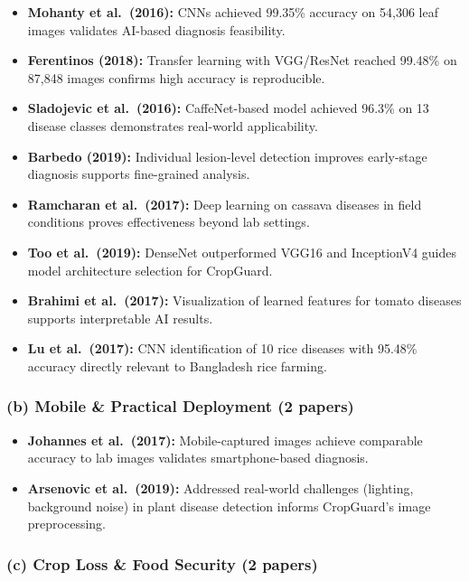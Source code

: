 \documentclass[12pt,a4paper]{article}
\begin{document}
\begin{itemize}[leftmargin=*, nosep]
    \item \textbf{Mohanty et al.\ (2016):} CNNs achieved 99.35\% accuracy on 54,306 leaf images  validates AI-based diagnosis feasibility.
    \item \textbf{Ferentinos (2018):} Transfer learning with VGG/ResNet reached 99.48\% on 87,848 images  confirms high accuracy is reproducible.
    \item \textbf{Sladojevic et al.\ (2016):} CaffeNet-based model achieved 96.3\% on 13 disease classes  demonstrates real-world applicability.
    \item \textbf{Barbedo (2019):} Individual lesion-level detection improves early-stage diagnosis  supports fine-grained analysis.
    \item \textbf{Ramcharan et al.\ (2017):} Deep learning on cassava diseases in field conditions  proves effectiveness beyond lab settings.
    \item \textbf{Too et al.\ (2019):} DenseNet outperformed VGG16 and InceptionV4  guides model architecture selection for CropGuard.
    \item \textbf{Brahimi et al.\ (2017):} Visualization of learned features for tomato diseases supports interpretable AI results.
    \item \textbf{Lu et al.\ (2017):} CNN identification of 10 rice diseases with 95.48\% accuracy  directly relevant to Bangladesh rice farming.
\end{itemize}

\subsubsection*{(b) Mobile \& Practical Deployment (2 papers)}

\begin{itemize}[leftmargin=*, nosep]
    \item \textbf{Johannes et al.\ (2017):} Mobile-captured images achieve comparable accuracy to lab images validates smartphone-based diagnosis.
    \item \textbf{Arsenovic et al.\ (2019):} Addressed real-world challenges (lighting, background noise) in plant disease detection informs CropGuard's image preprocessing.
\end{itemize}

\subsubsection*{(c) Crop Loss \& Food Security (2 papers)}
\end{document}
